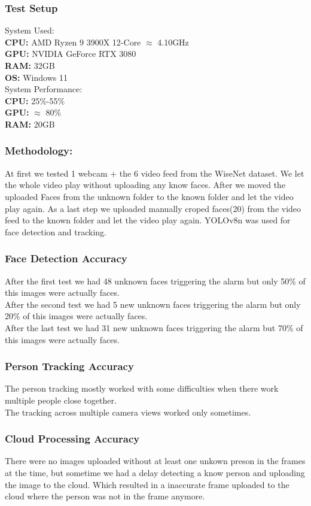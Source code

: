 \documentclass[conference]{IEEEtran}
\begin{document}
\subsubsection{Test Setup}

System Used:\\
\textbf{CPU:} AMD Ryzen 9 3900X 12-Core $\approx$ 4.10GHz\\
\textbf{GPU:} NVIDIA GeForce RTX 3080\\
\textbf{RAM:} 32GB\\
\textbf{OS:} Windows 11\\
System Performance:\\
\textbf{CPU:} 25\%-55\%\\
\textbf{GPU:} $\approx$ 80\%\\
\textbf{RAM:} 20GB
\subsubsection{Methodology:}
At first we tested 1 webcam + the 6 video feed from the WiseNet dataset. We let the whole video play without uploading any know faces.
After we moved the uploaded Faces from the unknown folder to the known folder and let the video play again.
As a last step we uploaded manually croped faces(20) from the video feed to the known folder and let the video play again.
YOLOv8n was used for face detection and tracking.
\subsubsection{Face Detection Accuracy}
After the first test we had 48 unknown faces triggering the alarm but only 50\% of this images were actually faces.\\
After the second test we had 5 new unknown faces triggering the alarm but only 20\% of this images were actually faces.\\
After the last test we had 31 new unknown faces triggering the alarm but 70\% of this images were actually faces.\\

\subsubsection{Person Tracking Accuracy}
The person tracking mostly worked with some difficulties when there work multiple people close together.\\
The tracking across multiple camera views worked only sometimes.

\subsubsection{Cloud Processing Accuracy}
There were no images uploaded without at least one unkown preson in the frames at the time, but 
sometime we had a delay detecting a know person and uploading the image to the cloud.
Which resulted in a inaccurate frame uploaded to the cloud where the person was not in the frame anymore.
\end{document}
